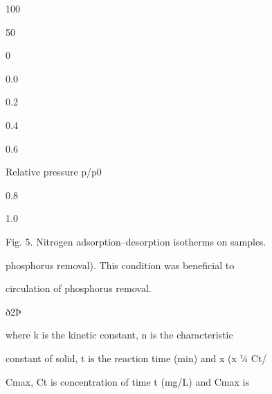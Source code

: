 \documentclass[a4paper,portrait,12pt]{article}
\begin{document}
100


50


0


0.0





0.2





0.4


0.6


\begin{flushleft}
Relative pressure p/p0
\end{flushleft}





0.8





1.0





\begin{flushleft}
Fig. 5. Nitrogen adsorption--desorption isotherms on samples.
\end{flushleft}





\begin{flushleft}
phosphorus removal). This condition was beneﬁcial to
\end{flushleft}


\begin{flushleft}
circulation of phosphorus removal.
\end{flushleft}





\begin{flushleft}
ð2Þ
\end{flushleft}





\begin{flushleft}
where k is the kinetic constant, n is the characteristic
\end{flushleft}


\begin{flushleft}
constant of solid, t is the reaction time (min) and x (x ¼ Ct/
\end{flushleft}


\begin{flushleft}
Cmax, Ct is concentration of time t (mg/L) and Cmax is
\end{flushleft}
\end{document}
